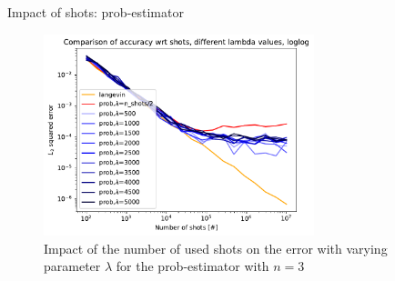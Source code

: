 \documentclass{beamer}
\begin{document}
\begin{frame}{Impact of shots: prob-estimator}
    \begin{figure}[H]
        \centering
        \includegraphics[width=0.7\textwidth]{figures/experiments/shots/shots_acc_comp_shots_exp_lambda_prob_with_var_lambda_loglog-1.png}
        \caption{Impact of the number of used shots on the error with varying parameter $\lambda$ for the prob-estimator with $n=3$}
    \end{figure}
\end{frame}
\end{document}
